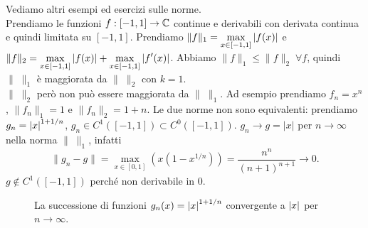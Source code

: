 Vediamo altri esempi ed esercizi sulle norme.\\
Prendiamo le funzioni $f: [-1, 1] \to \mathbb C$ continue e derivabili con
derivata continua e quindi limitata su $[-1, 1]$.
Prendiamo $ \displaystyle \|f\|_1 = \max_{x \in [-1, 1]} {\left|f(x)\right|}$ e $ \displaystyle
\|f\|_2 = \max_{x \in [-1, 1]} {\left|f(x)\right|} + \max_{x \in [-1, 1]} {\left|f'(x)\right|}$.
Abbiamo $\|f\|_1 \leq \|f\|_2 \; \forall f$, quindi $\| \; \|_1$ è maggiorata
da $\| \; \|_2$ con $k = 1$.\\
$\| \; \|_2$ però non può essere maggiorata da $\| \; \|_1$.
Ad esempio prendiamo $f_n = x^n$, $\|f_n\|_1 = 1$ e $\|f_n\|_2= 1 + n$.
Le due norme non sono equivalenti: prendiamo $g_n={\left|x\right|}^{1+1/n}$,
$g_n\in C^1([-1, 1]) \subset C^0([-1, 1])$. $g_n \to g = |x|$ 
per $n \to \infty$ nella norma $\| \; \|_1$, infatti
\[
\|g_n - g\| = \max_{x \in [0,1] }(x(1 - x^{1/n})) = \frac{n^n}
{(n+1)^{n+1}} \to 0
.\]
$g \notin C^1([-1, 1])$ perché non derivabile in $0$.
\begin{figure}[!htb]
	\centering 
		\def\svgwidth{\columnwidth}
		\resizebox{10cm}{6cm}{}
	\caption{La successione di funzioni $g_n(x) = {\left|x\right|}^{1 + 1/n}$
	 convergente a ${\left|x\right|}$ per $n \to \infty$.
	\label{2nrm_absx}}
\end{figure}

